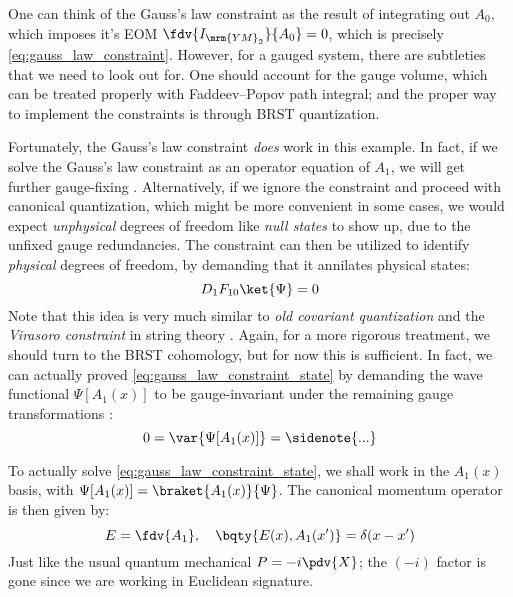\documentclass[a4paper
	,10pt
]{article}
\newcommand{\YM}{{\ensuremath{\mrm{YM}_2}}\xspace}
\begin{document}
	One can think of the Gauss's law constraint as the result of integrating out $A_0$, which imposes it's EOM $\fdv{I_\YM}{A_0} = 0$, which is precisely \eqref{eq:gauss_law_constraint}. 
	However, for a gauged system, there are subtleties that we need to look out for. One should account for the gauge volume, which can be treated properly with Faddeev--Popov path integral; and the proper way to implement the constraints is through BRST quantization. 
	
	Fortunately, the Gauss's law constraint \textit{does} work in this example. In fact, if we solve the Gauss's law constraint as an operator equation of $A_1$, we will get further gauge-fixing \cite{Hatfield:234595}. 
	Alternatively, if we ignore the constraint and proceed with canonical quantization, which might be more convenient in some cases, we would expect \textit{unphysical} degrees of freedom like \textit{null states} to show up, due to the unfixed gauge redundancies. The constraint can then be utilized to identify \textit{physical} degrees of freedom, by demanding that it annilates physical states:
	\begin{equation}
		D_1 F_{10} \ket{\Psi} = 0
	\label{eq:gauss_law_constraint_state}
	\end{equation}
	Note that this idea is very much similar to \textit{old covariant quantization} and the \textit{Virasoro constraint} in string theory \cite{Polchinski:1998rq}. Again, for a more rigorous treatment, we should turn to the BRST cohomology, but for now this is sufficient. In fact, we can actually proved \eqref{eq:gauss_law_constraint_state} by demanding the wave functional $\Psi[A_1(x)]$ to be gauge-invariant under the remaining gauge transformations \cite{Hatfield:234595}:
	\begin{equation}
		0 = \var{\Psi[A_1(x)]}
		= \sidenote{...}
	\end{equation}
	
	To actually solve \eqref{eq:gauss_law_constraint_state}, we shall work in the $A_1(x)$ basis, with $\Psi[A_1(x)] = \braket{A_1(x)}{\Psi}$. The canonical momentum operator is then given by:
	\begin{equation}
		E = \fdv{A_1},
	\quad
		\bqty{
			E(x), A_1(x')
		} = \delta(x - x')
	\end{equation}
	Just like the usual quantum mechanical $P = - i\pdv{X}$; the $(-i)$ factor is gone since we are working in Euclidean signature. 
	
\raggedright

\printbibliography[%
	,heading = bibintoc
]
\end{document}
